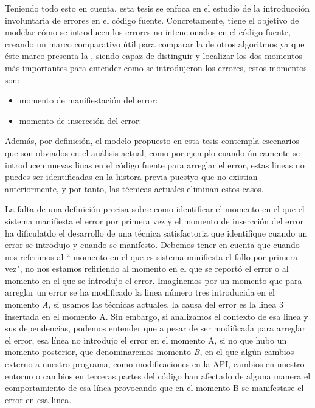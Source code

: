 \documentclass[a4paper, 12pt]{book}
\begin{document}
Teniendo todo esto en cuenta, esta tesis se enfoca en el estudio de la introducci\'on involuntaria de errores en el c\'odigo fuente. Concretamente, tiene el objetivo de modelar c\'omo se introducen los errores no intencionados en el c\'odigo fuente, creando un marco comparativo \'util para  comparar la  de otros algoritmos ya que \'este marco presenta la , siendo capaz de distinguir y localizar los dos momentos m\'as importantes para entender como se introdujeron los errores, estos momentos son:
\begin{itemize}
  \item momento de manifiestaci\'on del error:
  \item momento de insercci\'on del error:
\end{itemize}

Adem\'as, por definici\'on, el modelo propuesto en esta tesis contempla escenarios que son obviados en el an\'alisis actual, como por ejemplo cuando \'unicamente se introducen nuevas linas en el c\'odigo fuente para arreglar el error, estas lineas no puedes ser identificadas en la histora previa puestyo que no existian anteriormente, y por tanto, las t\'ecnicas actuales eliminan estos casos.

La falta de una definici\'on precisa sobre como identificar el momento en el que el sistema manifiesta el error por primera vez y el momento de insercci\'on del error ha dificulatdo el desarrollo de una t\'ecnica satisfactoria que identifique cuando un error se introdujo y cuando se manifesto. Debemos tener en cuenta que cuando nos referimos al `` momento en el que es sistema minifiesta el fallo por primera vez", no nos estamos refiriendo al momento en el que se report\'o el error o al momento en el que se introdujo el error. Imaginemos por un momento que para arreglar un error se ha modificado la linea n\'umero tres introducida en el momento \emph{A}, si usamos las t\'ecnicas actuales, la causa del error es la linea 3 insertada en el momento A. Sin embargo, si analizamos el contexto de esa linea y sus dependencias, podemos entender que a pesar de ser modificada para arreglar el error, esa l\'inea no introdujo el error en el momento A, si no que hubo un momento posterior, que denominaremos momento \emph{B}, en el que alg\'un cambios externo a nuestro programa, como modificaciones en la API, cambios en nuestro entorno o cambios en terceras partes del c\'odigo han afectado de alguna manera el comportamiento de  esa l\'inea provocando que en el momento B se manifestase el error en esa linea.
\end{document}
